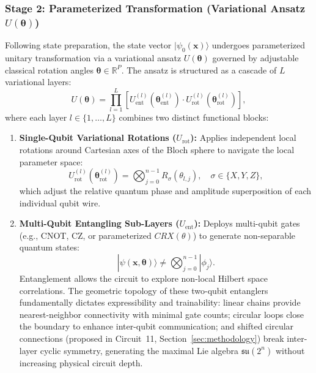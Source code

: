 \documentclass[pdflatex,sn-mathphys-num]{sn-jnl}%
\theoremstyle{thmstyleone}%
\theoremstyle{thmstyletwo}%
\theoremstyle{thmstylethree}%
\begin{document}
\subsubsection{Stage 2: Parameterized Transformation (Variational Ansatz $U(\boldsymbol{\theta})$)}
Following state preparation, the state vector $|\psi_0(\mathbf{x})\rangle$ undergoes parameterized unitary transformation via a variational ansatz $U(\boldsymbol{\theta})$ governed by adjustable classical rotation angles $\boldsymbol{\theta} \in \mathbb{R}^P$. The ansatz is structured as a cascade of $L$ variational layers:
\begin{equation}
U(\boldsymbol{\theta}) = \prod_{l=1}^L \left[ U_{\mathrm{ent}}^{(l)}(\boldsymbol{\theta}_{\mathrm{ent}}^{(l)}) \cdot U_{\mathrm{rot}}^{(l)}(\boldsymbol{\theta}_{\mathrm{rot}}^{(l)}) \right],
\label{eq:ansatz_general_flow}
\end{equation}
where each layer $l \in \{1, \dots, L\}$ combines two distinct functional blocks:
\begin{enumerate}
    \item \textbf{Single-Qubit Variational Rotations ($U_{\mathrm{rot}}$):} Applies independent local rotations around Cartesian axes of the Bloch sphere to navigate the local parameter space:
    \begin{equation}
    U_{\mathrm{rot}}^{(l)}(\boldsymbol{\theta}_{\mathrm{rot}}^{(l)}) = \bigotimes_{j=0}^{n-1} R_{\sigma}\left(\theta_{l,j}\right), \quad \sigma \in \{X, Y, Z\},
    \label{eq:rot_block_general}
    \end{equation}
    which adjust the relative quantum phase and amplitude superposition of each individual qubit wire.
    \item \textbf{Multi-Qubit Entangling Sub-Layers ($U_{\mathrm{ent}}$):} Deploys multi-qubit gates (e.g., CNOT, CZ, or parameterized $CRX(\theta)$) to generate non-separable quantum states:
    \begin{equation}
    |\psi(\mathbf{x}, \boldsymbol{\theta})\rangle \neq \bigotimes_{j=0}^{n-1} |\phi_j\rangle.
    \label{eq:entanglement_nonseparable}
    \end{equation}
    Entanglement allows the circuit to explore non-local Hilbert space correlations. The geometric topology of these two-qubit entanglers fundamentally dictates expressibility and trainability: linear chains provide nearest-neighbor connectivity with minimal gate counts; circular loops close the boundary to enhance inter-qubit communication; and shifted circular connections (proposed in Circuit~11, Section~\ref{sec:methodology}) break inter-layer cyclic symmetry, generating the maximal Lie algebra $\mathfrak{su}(2^n)$ without increasing physical circuit depth.
\end{enumerate}
\end{document}
